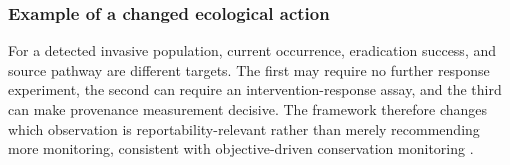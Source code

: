 

\subsubsection{Example of a changed ecological action}
For a detected invasive population, current occurrence, eradication success, and source pathway are different targets. The first may require no further response experiment, the second can require an intervention-response assay, and the third can make provenance measurement decisive. The framework therefore changes which observation is reportability-relevant rather than merely recommending more monitoring, consistent with objective-driven conservation monitoring \cite{NicholsWilliams2006}.
